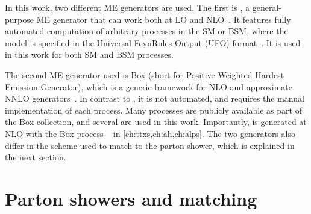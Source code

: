In this work, two different ME generators are used. The first is \amcatnlo, a general-purpose ME generator that can work both at LO and NLO~\cite{MG5aMCatNLO:2014}. It features fully automated computation of arbitrary processes in the SM or BSM, where the model is specified in the Universal FeynRules Output (UFO) format~\cite{Degrande:2011ua}. It is used in this work for both SM and BSM processes. 

The second ME generator used is \powheg Box (short for Positive Weighted Hardest Emission Generator), which is a generic framework for NLO and approximate NNLO generators~\cite{Powheg:2004,Powheg:2007,Powheg:2010}. In contrast to \amcatnlo, it is not automated, and requires the manual implementation of each process. Many processes are publicly available as part of the \powheg Box collection, and several are used in this work. Importantly, \pptt is generated at NLO with the \powheg Box process \hvq~\cite{Frixione:2007nw} in \cref{ch:ttxs,ch:ah,ch:alps}. %
The two generators also differ in the scheme used to match to the parton shower, which is explained in the next section.

\section{Parton showers and matching}
\label{sec:mc:showering}


